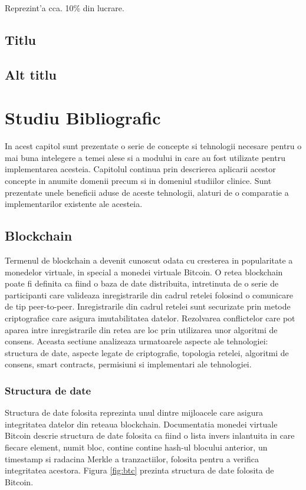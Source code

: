 \documentclass[12pt,a4paper,twoside]{report}
\begin{document}
Reprezint'a cca. 10\% din lucrare.
\section{Titlu}
\section{Alt titlu}

\chapter{Studiu Bibliografic}
	In acest capitol sunt prezentate o serie de concepte si tehnologii necesare pentru o mai buna intelegere a temei alese si a modului in care au fost utilizate pentru implementarea acesteia. Capitolul continua prin descrierea aplicarii acestor concepte in anumite domenii precum si in domeniul studiilor clinice. Sunt prezentate unele beneficii aduse de aceste tehnologii, alaturi de o comparatie a implementarilor existente ale acesteia.
	\section{Blockchain}	
	Termenul de blockchain a devenit cunoscut odata cu cresterea in popularitate a monedelor virtuale, in special a monedei virtuale Bitcoin. O retea blockchain poate fi definita ca fiind o baza de date distribuita, intretinuta de o serie de participanti care valideaza inregistrarile din cadrul retelei folosind o comunicare de tip peer-to-peer. Inregistrarile din cadrul retelei sunt securizate prin metode criptografice care asigura imutabilitatea datelor. Rezolvarea conflictelor care pot aparea intre inregistrarile din retea are loc prin utilizarea unor algoritmi de consens. Aceasta sectiune analizeaza urmatoarele aspecte ale tehnologiei: structura de date, aspecte legate de criptografie, topologia retelei, algoritmi de consens, smart contracts, permisiuni si implementari ale tehnologiei.

	\subsection{Structura de date}
	Structura de date folosita reprezinta unul dintre mijloacele care asigura integritatea datelor din reteaua blockchain. Documentatia monedei virtuale Bitcoin descrie structura de date folosita ca fiind o lista invers inlantuita in care fiecare element, numit bloc, contine contine hash-ul blocului anterior, un timestamp si radacina Merkle a tranzactiilor, folosita pentru a verifica integritatea acestora. Figura \ref{fig:btc} prezinta structura de date folosita de Bitcoin\cite{bitcoin}. \\
	
\end{document}
